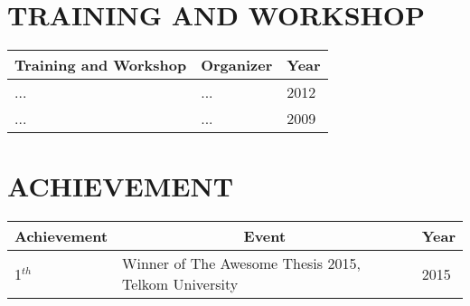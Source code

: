 \section*{TRAINING AND WORKSHOP}
\begin{table}[H]
	\begin{tabular}{|p{6cm}|p{6cm}|p{1cm}|}
		\hline
		\multicolumn{1}{|c|}{{\bf Training and Workshop}} & \multicolumn{1}{c|}{{\bf Organizer}} & \multicolumn{1}{c|}{{\bf Year}} \\ \hline
		... & ... & 2012\\ 
		\hline
		... & ... & 2009 \\ \hline
	\end{tabular}
\end{table}

\section*{ACHIEVEMENT}
\begin{table}[H]
	\begin{tabular}{|p{6cm}|p{6cm}|p{1cm}|}
		\hline
		\multicolumn{1}{|c|}{{\bf Achievement}} & \multicolumn{1}{c|}{{\bf Event}} & \multicolumn{1}{c|}{{\bf Year}} \\ \hline
		1$^{th}$ & Winner of The Awesome Thesis 2015, Telkom University & 2015\\ 
		\hline
	\end{tabular}
\end{table}

